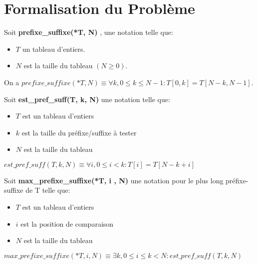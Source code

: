 \section{Formalisation du Problème}\label{formalisation}

Soit \textbf{prefixe\_suffixe(*T, N)} , une notation telle que:
\begin{itemize}
   \item $T$ un tableau d'entiers.
   \item $N$ est la taille du tableau $(N \geq 0)$.
\end{itemize}

\vspace{0.2cm}
On a $prefixe\_suffixe (*T, N) \equiv \forall k, 0 \leq k \leq N-1 : T[0, k] = T[N-k, N-1]$.

\vspace{0.4cm}
Soit \textbf{est\_pref\_suff(T, k, N)} une notation telle que:
\begin{itemize}
   \item $T$ est un tableau d'entiers
   \item $k$ est la taille du préfixe/suffixe à tester
   \item $N$ est la taille du tableau
\end{itemize}

\vspace{0.2cm}
$est\_pref\_suff(T, k, N) \equiv \forall i, 0 \leq i < k : T[i] = T[N-k+i]$

\vspace{0.4cm}
Soit \textbf{max\_prefixe\_suffixe(*T, i , N)} une notation pour le plus long 
préfixe-suffixe de T telle que:
\begin{itemize}
   \item $T$ est un tableau d'entiers
   \item $i$ est la position de comparaison
   \item $N$ est la taille du tableau
\end{itemize}

\vspace{0.2cm}
$max\_prefixe\_suffixe(*T, i , N) \equiv \exists k, 0 \leq i \leq k < N : est\_pref\_suff(T, k, N)$
